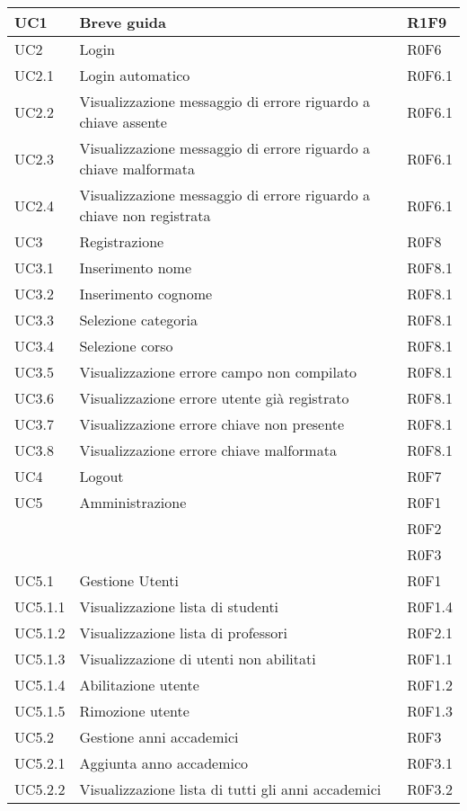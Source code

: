 \documentclass[AnalisiDeiRequisiti.tex]{subfiles}
\begin{document}
\begin{longtable}[H]{|p{2cm}|p{5cm}|p{5cm}|}
	UC1 & Breve guida & R1F9 \\ \hline
	UC2 & Login & R0F6 \\ \hline
	UC2.1 & Login automatico & R0F6.1 \\ \hline
	UC2.2 & Visualizzazione messaggio di errore riguardo a chiave assente & R0F6.1 \\ \hline
	UC2.3 & Visualizzazione messaggio di errore riguardo a chiave malformata & R0F6.1 \\ \hline
	UC2.4 & Visualizzazione messaggio di errore riguardo a chiave non registrata & R0F6.1 \\ \hline
	UC3 & Registrazione & R0F8 \\ \hline %
	UC3.1 & Inserimento nome & R0F8.1 \\ \hline
	UC3.2 & Inserimento cognome & R0F8.1 \\ \hline
	UC3.3 & Selezione categoria & R0F8.1 \\ \hline
	UC3.4 & Selezione corso & R0F8.1 \\ \hline
	UC3.5 & Visualizzazione errore campo non compilato & R0F8.1 \\ \hline
	UC3.6 & Visualizzazione errore utente già registrato & R0F8.1 \\ \hline
	UC3.7 & Visualizzazione errore chiave non presente & R0F8.1 \\ \hline
	UC3.8 & Visualizzazione errore chiave malformata & R0F8.1 \\ \hline
	UC4 & Logout & R0F7 \\ \hline
	UC5 & Amministrazione &  R0F1 \\ 
	& & R0F2 \\
	& & R0F3 \\ \hline
	UC5.1 & Gestione Utenti &  R0F1 \\ \hline
	UC5.1.1 & Visualizzazione lista di studenti & R0F1.4 \\ \hline
	UC5.1.2 & Visualizzazione lista di professori &  R0F2.1\\ \hline
	UC5.1.3 & Visualizzazione di utenti non abilitati & R0F1.1 \\ \hline
	UC5.1.4 & Abilitazione utente & R0F1.2 \\  \hline 
	UC5.1.5 & Rimozione utente & R0F1.3 \\ \hline
	UC5.2 & Gestione anni accademici &  R0F3 \\ \hline
	UC5.2.1 & Aggiunta anno accademico &  R0F3.1 \\ \hline
	UC5.2.2 & Visualizzazione lista di tutti gli anni accademici & R0F3.2 \\ \hline

\end{longtable}
\end{document}
